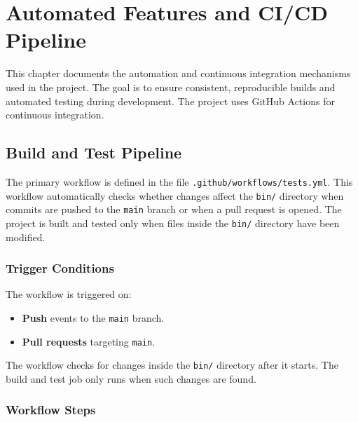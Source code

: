 \chapter{Automated Features and CI/CD Pipeline}\label{chapter:ci_cd_pipeline}
\pagestyle{fancy}

This chapter documents the automation and continuous integration mechanisms used in the project. The goal is to ensure consistent, reproducible builds and automated testing during development. The project uses GitHub Actions for continuous integration. 




\section{Build and Test Pipeline}\label{section:github_actions}

The primary workflow is defined in the file \texttt{.github/workflows/tests.yml}. This workflow automatically checks whether changes affect the \texttt{bin/} directory when commits are pushed to the \texttt{main} branch or when a pull request is opened. The project is built and tested only when files inside the \texttt{bin/} directory have been modified.

\subsection{Trigger Conditions}

The workflow is triggered on:
\begin{itemize}\itemsep0em
	\item \textbf{Push} events to the \texttt{main} branch.
	\item \textbf{Pull requests} targeting \texttt{main}.
\end{itemize}
The workflow checks for changes inside the \texttt{bin/} directory after it starts. The build and test job only runs when such changes are found.

\subsection{Workflow Steps}

